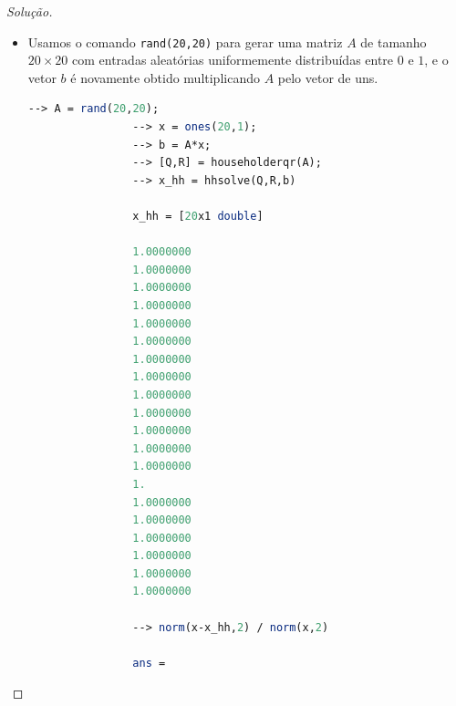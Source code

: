 \documentclass{article}
\begin{document}
\begin{proof}[Solução]
\begin{itemize}
\begin{lstlisting}[language=Scilab, caption={Solução de \(Ax=b\) para \(A\) sendo a matriz de Hilbert de ordem 20}]
                 x_hh = [20x1 double]

                0.9999999
                1.0000094
                0.9997613
                1.0007986
                1.0336614
                0.5270355
                3.7978987
                -7.4901572
                11.862756
                9.8569788
                -46.938380
                47.722438
                31.006309
                -81.392266
                8.0181397
                104.61935
                -106.59523
                40.728166
                0.2934896
                -1.0507570

                --> norm(x-x_hh,2) / norm(x,2)

                ans = 

                4.266D+01

                --> norm(A*x_hh-b,2) / norm(b,2)

                ans = 

                1.087D-15
            \end{lstlisting}
        \item [(c)] Usamos o comando \texttt{rand(20,20)} para gerar uma matriz \(A\) de tamanho \(20 \times 20\) com entradas aleatórias uniformemente distribuídas entre \(0\) e \(1\), e o vetor \(b\) é novamente obtido multiplicando \(A\) pelo vetor de uns. 
            \begin{lstlisting}[language=Scilab, caption={Solução de \(Ax=b\) para \(A\) sendo uma matriz gerada randomicamente de ordem 20}]
                --> A = rand(20,20);
                --> x = ones(20,1);
                --> b = A*x;
                --> [Q,R] = householderqr(A);
                --> x_hh = hhsolve(Q,R,b)

                x_hh = [20x1 double]

                1.0000000
                1.0000000
                1.0000000
                1.0000000
                1.0000000
                1.0000000
                1.0000000
                1.0000000
                1.0000000
                1.0000000
                1.0000000
                1.0000000
                1.0000000
                1.
                1.0000000
                1.0000000
                1.0000000
                1.0000000
                1.0000000
                1.0000000

                --> norm(x-x_hh,2) / norm(x,2)

                ans = 


\end{lstlisting}
\end{itemize}
\end{proof}
\end{document}
